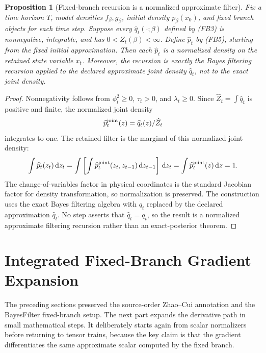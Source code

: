\documentclass[11pt]{article}
\newtheorem{proposition}{Proposition}
\newcommand{\dd}{\,\mathrm d}
\begin{document}
\begin{proposition}[Fixed-branch recursion is a normalized approximate filter]
Fix a time horizon \(T\), model densities \(f_\beta,g_\beta\), initial density
\(p_\beta(x_0)\), and fixed branch objects for each time step.  Suppose every
\(\widehat q_t(\cdot;\beta)\) defined by (FB3) is nonnegative, integrable, and
has \(0<\widehat Z_t(\beta)<\infty\).  Define \(\widehat p_t\) by (FB5),
starting from the fixed initial approximation.  Then each \(\widehat p_t\) is a
normalized density on the retained state variable \(x_t\).  Moreover, the
recursion is exactly the Bayes filtering recursion applied to the declared
approximate joint density \(\widehat q_t\), not to the exact joint density.
\end{proposition}

\begin{proof}
Nonnegativity follows from
\(\phi_t^2\ge0\), \(\tau_t>0\), and \(\lambda_t\ge0\).  Since
\(\widehat Z_t=\int\widehat q_t\) is positive and finite, the normalized joint
density
\[
    \widehat p_t^{\rm joint}(z)
    =
    \widehat q_t(z)/\widehat Z_t
\]
integrates to one.  The retained filter is the marginal of this normalized
joint density:
\[
    \int \widehat p_t(z_t)\dd z_t
    =
    \int
    \left[
    \int \widehat p_t^{\rm joint}(z_t,z_{t-1})\dd z_{t-1}
    \right]\dd z_t
    =
    \int \widehat p_t^{\rm joint}(z)\dd z
    =
    1.
\]
The change-of-variables factor in physical coordinates is the standard
Jacobian factor for density transformation, so normalization is preserved.  The
construction uses the exact Bayes filtering algebra with \(q_t\) replaced by
the declared approximation \(\widehat q_t\).  No step asserts that
\(\widehat q_t=q_t\), so the result is a normalized approximate filtering
recursion rather than an exact-posterior theorem.
\end{proof}


\section{Integrated Fixed-Branch Gradient Expansion}

The preceding sections preserved the source-order Zhao--Cui annotation and the
BayesFilter fixed-branch setup.  The next part expands the derivative path in
small mathematical steps.  It deliberately starts again from scalar
normalizers before returning to tensor trains, because the key claim is that
the gradient differentiates the same approximate scalar computed by the fixed
branch.
\end{document}

